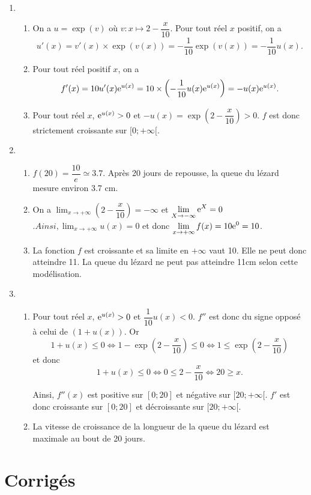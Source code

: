 \documentclass[11pt,fleqn, openany]{book} %
\begin{document}
\begin{solution}\hspace{10pt}
\begin{enumerate}
\item \begin{enumerate}
\item On a $u=\exp(v)$ où $v:x\mapsto 2-\dfrac{x}{10}$. Pour tout réel $x$ positif, on a
\[u'(x)=v'(x)\times \exp(v(x)) =-\dfrac{1}{10}\exp(v(x)) =  -\dfrac{1}{10}u(x).\]
\item Pour tout réel positif $x$, on a 
\[f'(x)= 10u'(x) \mathrm{e}^{u(x)} = 10 \times \left( -\dfrac{1}{10}u(x)\mathrm{e}^{u(x)} \right)=-u(x)\mathrm{e}^{u(x)} .\]
\item Pour tout réel $x$, $\mathrm{e}^{u(x)}>0$ et $-u(x)=\exp\left(2-\dfrac{x}{10}\right)>0$. $f$ est donc strictement croissante sur $[0;+\infty[$.\end{enumerate}
\item \begin{enumerate}
\item $f(20) = \dfrac{10}{e}\simeq 3.7$. Après 20 jours de repousse, la queue du lézard mesure environ 3.7 cm.
\item On a $\displaystyle \lim_{x\to + \infty}\left(2-\dfrac{x}{10}\right)=-\infty$ et $\displaystyle \lim_{X\to - \infty}\mathrm{e}^X=0$ $. Ainsi, \displaystyle \lim_{x\to + \infty} u(x)=0$ et donc $\displaystyle \lim_{x \to + \infty} f(x) = 10\mathrm{e}^0=10$.
\item La fonction $f$ est croissante et sa limite en $+\infty$ vaut 10. Elle ne peut donc atteindre 11. La queue du lézard ne peut pas atteindre 11cm selon cette modélisation.\end{enumerate}
\item \begin{enumerate} \item Pour tout réel $x$, $\mathrm{e}^{u(x)}>0$ et $\dfrac{1}{10}u(x)<0$. $f''$ est donc du signe opposé à celui de $(1+u(x))$. Or
 \[1+u(x) \leqslant 0 \Leftrightarrow  1- \exp\left(2-\dfrac{x}{10}\right) \leqslant 0 \Leftrightarrow 1 \leqslant \exp\left(2-\dfrac{x}{10}\right)\]
 et donc
 \[ 1+u(x) \leqslant 0 \Leftrightarrow 0 \leqslant 2-\dfrac{x}{10} \Leftrightarrow 20 \geqslant x.\]
 
 Ainsi, $f''(x)$ est positive sur $[0;20] $ et négative sur $[20;+\infty[$. $f'$ est donc croissante sur $[0;20]$ et décroissante sur $[20;+\infty[$. 

\item La vitesse de croissance de la longueur de la queue du lézard est maximale au bout de 20 jours.
\end{enumerate}
\end{enumerate}\end{solution}


\chapter{Corrigés}


\printsolutions[headings={false} ]
\end{document}
